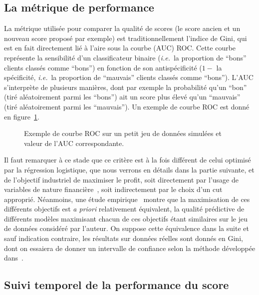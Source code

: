 \subsection{La métrique de performance}

La métrique utilisée pour comparer la qualité de \glspl{score} (le score ancien et un nouveau score proposé par exemple) est traditionnellement l'indice de Gini, qui est en fait directement lié à l'aire sous la courbe (AUC) ROC. Cette courbe représente la sensibilité d'un classificateur binaire (\textit{i.e.}\ la proportion de ``bons'' clients classés comme ``bons'') en fonction de son antispécificité ($1-$ la spécificité, \textit{i.e.}\ la proportion de ``mauvais'' clients classés comme ``bons''). L'AUC s'interprète de plusieurs manières, dont par exemple la probabilité qu'un ``bon'' (tiré aléatoirement parmi les ``bons'') ait un score plus élevé qu'un ``mauvais'' (tiré aléatoirement parmi les ``mauvais''). Un exemple de courbe ROC est donné en figure~\ref{fig:ROC}.

\begin{figure}
\centering \scalebox{.8}{}
\caption{\label{fig:ROC} Exemple de courbe ROC sur un petit jeu de données simulées et valeur de l'AUC correspondante.}
\end{figure}

Il faut remarquer à ce stade que ce critère est à la fois différent de celui optimisé par la régression logistique, que nous verrons en détails dans la partie suivante, et de l'objectif industriel de maximiser le profit, soit directement par l'usage de variables de nature financière~\cite{finlay2010credit}, soit indirectement par le choix d'un \gls{cut} approprié. Néanmoins, une étude empirique~\cite{finlay2009we} montre que la maximisation de ces différents objectifs est \textit{a priori} relativement équivalent, la qualité prédictive de différents modèles maximisant chacun de ces objectifs étant similaires sur le jeu de données considéré par l'auteur. On suppose cette équivalence dans la suite et sauf indication contraire, les résultats sur données réelles sont donnés en Gini, dont on essaiera de donner un intervalle de confiance selon la méthode développée dans~\cite{sun2014fast}.



\subsection{Suivi temporel de la performance du \gls{score}}

